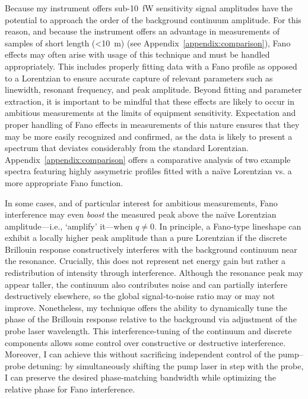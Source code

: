Because my instrument offers sub-\SI{10}{\femto\watt} sensitivity signal amplitudes have the potential to approach the order of the background continuum amplitude. For this reason, and because the instrument offers an advantage in measurements of samples of short length (<\SI{10}{m}) (see Appendix~\ref{appendix:comparison}), Fano effects may often arise with usage of this technique and must be handled appropriately. This includes properly fitting data with a Fano profile as opposed to a Lorentzian to ensure accurate capture of relevant parameters such as linewidth, resonant frequency, and peak amplitude. Beyond fitting and parameter extraction, it is important to be mindful that these effects are likely to occur in ambitious measurements at the limits of equipment sensitivity. Expectation and proper handling of Fano effects in measurements of this nature ensures that they may be more easily recognized and confirmed, as the data is likely to present a spectrum that deviates considerably from the standard Lorentzian. Appendix~\ref{appendix:comparison} offers a comparative analysis of two example spectra  featuring highly assymetric profiles fitted with a naïve Lorentzian vs. a more appropriate Fano function.

In some cases, and of particular interest for ambitious measurements, Fano interference may even \textit{boost} the measured peak above the naïve Lorentzian amplitude—i.e., ‘amplify’ it—when \(q \neq 0\). In principle, a Fano‐type lineshape can exhibit a locally higher peak amplitude than a pure Lorentzian if the discrete Brillouin response constructively interferes with the background continuum near the resonance. Crucially, this does not represent net energy gain but rather a redistribution of intensity through interference. Although the resonance peak may appear taller, the continuum also contributes noise and can partially interfere destructively elsewhere, so the global signal‐to‐noise ratio may or may not improve. Nonetheless, my technique offers the ability to dynamically tune the phase of the Brillouin response relative to the background via adjustment of the probe laser wavelength. This interference-tuning of the continuum and discrete components allows some control over constructive or destructive interference. Moreover, I can achieve this without sacrificing independent control of the pump–probe detuning: by simultaneously shifting the pump laser in step with the probe, I can preserve the desired phase‐matching bandwidth while optimizing the relative phase for Fano interference.

